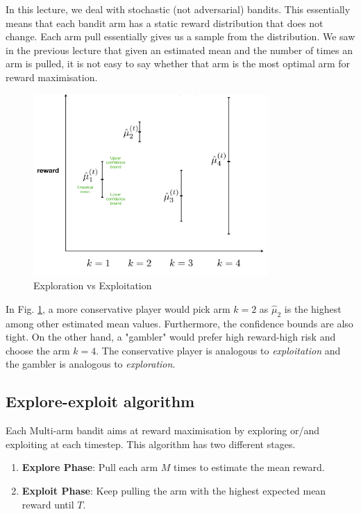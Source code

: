 \documentclass[11pt]{article}
\begin{document}
In this lecture, we deal with stochastic (not adversarial) bandits. This essentially means that each bandit arm has a static reward distribution that does not change. Each arm pull essentially gives us a sample from the distribution. We saw in the previous lecture that given an estimated mean and the number of times an arm is pulled, it is not easy to say whether that arm is the most optimal arm for reward maximisation. 

\begin{figure}[h!]
    \centering
    \includegraphics[width=0.8\textwidth]{figs/Screen Shot 2022-03-03 at 11.25.24 PM.png}
    \caption{Exploration vs Exploitation}
    \label{plot}
\end{figure}


In Fig. \ref{plot}, a more conservative player would pick arm $k=2$ as $\hat{\mu}_{2}$ is the highest among other estimated mean values. Furthermore, the confidence bounds are also tight. On the other hand, a "gambler" would prefer high reward-high risk and choose the arm $k=4$. The conservative player is analogous to \textit{exploitation} and the gambler is analogous to \textit{exploration}.

\subsection{Explore-exploit algorithm}
Each Multi-arm bandit aims at reward maximisation by exploring or/and exploiting at each timestep.
This algorithm has two different stages. 
\begin{enumerate}
    \item \textbf{Explore Phase}: Pull each arm $M$ times to estimate the mean reward.
    \item \textbf{Exploit Phase}: Keep pulling the arm with the highest expected mean reward until $T$.
\end{enumerate}
\end{document}
